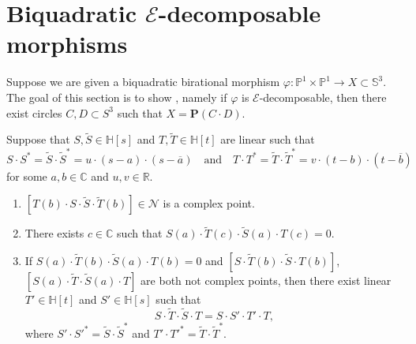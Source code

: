 \documentclass[11pt]{article}
\newenvironment{claims}{\begin{enumerate}[topsep=0pt,itemsep=0pt,leftmargin=8mm,label=\textnormal{\textbf{(\alph*)}},ref=(\alph*)]}{\end{enumerate}}
\newcommand{\C}{\mathbb{C}}
\newcommand{\R}{\mathbb{R}}
\renewcommand{\H}{\mathbb{H}}
\renewcommand{\P}{\mathbb{P}}
\renewcommand{\S}{\mathbb{S}}
\newcommand{\bP}{\mathbf{P}}
\newcommand{\cN}{\mathcal{N}}
\newcommand{\cE}{\mathcal{E}}
\newcommand{\tS}{\tilde{S}}
\newcommand{\tT}{\tilde{T}}
\newcommand{\oa}{{\overline{a}}}
\newcommand{\ob}{{\overline{b}}}
\renewcommand{\c}{\colon}
\newcommand{\st}{such that }
\begin{document}
\section{Biquadratic \texorpdfstring{$\cE$}{E}-decomposable morphisms}
\label{sec:E}

Suppose we are given a biquadratic birational morphism
$\varphi\c\P^1\times\P^1\to X\subset \S^3$.
The goal of this section is to show ,
namely if $\varphi$ is $\cE$-decomposable,
then there exist circles $C,D\subset S^3$ \st $X=\bP(C\cdot D)$.

\begin{lemma}
\label{lem:ST}
Suppose that $S,\tS\in\H[s]$ and $T,\tT\in\H[t]$ are linear \st
\[
S\cdot S^*=\tS\cdot\tS^*=u\cdot (s-a)\cdot(s-\oa)
\quad\text{and}\quad
T\cdot T^*=\tT\cdot\tT^*=v\cdot (t-b)\cdot(t-\ob)
\]
for some $a,b\in\C$ and $u,v\in\R$.
\begin{claims}
\item\label{lem:ST:a} $[T(b)\cdot S \cdot\tS \cdot \tT(b)]\in \cN$ is a complex point.
\item\label{lem:ST:b} There exists $c\in\C$ \st $S(a)\cdot \tT(c)\cdot \tS(a)\cdot T(c)=0$.
\item\label{lem:ST:c} If $S(a)\cdot\tT(b)\cdot\tS(a)\cdot T(b)=0$
and
$[S\cdot\tT(b)\cdot\tS\cdot T(b)]$,
$[S(a)\cdot\tT\cdot\tS(a)\cdot T]$
are both not complex points,
then there exist linear $T'\in\H[t]$ and $S'\in\H[s]$ \st
\[
S\cdot\tT\cdot\tS\cdot T=S\cdot S'\cdot T'\cdot T,
\]
where $S'\cdot S'^*=\tS\cdot\tS^*$ and $T'\cdot T'^*=\tT\cdot\tT^*$.
\end{claims}
\end{lemma}
\end{document}
